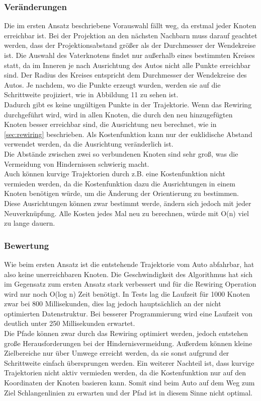\subsubsection{Veränderungen}
Die im ersten Ansatz beschriebene Vorauswahl fällt weg, da erstmal jeder Knoten erreichbar ist. Bei der Projektion an den nächsten Nachbarn muss darauf geachtet werden, dass der Projektionsabstand größer als der Durchmesser der Wendekreise ist. Die Auswahl des Vaterknotens findet nur außerhalb eines bestimmten Kreises statt, da im Inneren je nach Ausrichtung des Autos nicht alle Punkte erreichbar sind. Der Radius des Kreises entspricht dem Durchmesser der Wendekreise des Autos. Je nachdem, wo die Punkte erzeugt wurden, werden sie auf die Schrittweite projiziert, wie in Abbildung 11 zu sehen ist.\\
Dadurch gibt es keine ungültigen Punkte in der Trajektorie. Wenn das Rewiring durchgeführt wird, wird in allen Knoten, die durch den neu hinzugefügten Knoten besser erreichbar sind, die Ausrichtung neu berechnet, wie in \ref{sec:rewiring} beschrieben. Als Kostenfunktion kann nur der euklidische Abstand verwendet werden, da die Ausrichtung veränderlich ist. \\
Die Abstände zwischen zwei so verbundenen Knoten sind sehr groß, was die Vermeidung von Hindernissen schwierig macht.\\
Auch können kurvige Trajektorien durch z.B. eine Kostenfunktion nicht vermieden werden, da die Kostenfunktion dazu die Ausrichtungen in einem Knoten benötigen würde, um die Änderung der Orientierung zu bestimmen. Diese Ausrichtungen können zwar bestimmt werde, ändern sich jedoch mit jeder Neuverknüpfung. Alle Kosten jedes Mal neu zu berechnen, würde mit O(n) viel zu lange dauern.\\
\subsubsection{Bewertung}
Wie beim ersten Ansatz ist die entstehende Trajektorie vom Auto abfahrbar, hat also keine unerreichbaren Knoten. Die Geschwindigkeit des Algorithmus hat sich im Gegensatz zum ersten Ansatz stark verbessert und für die Rewiring Operation wird nur noch O(log n) Zeit benötigt. In Tests lag die Laufzeit für 1000 Knoten zwar bei 800 Millisekunden, dies lag jedoch hauptsächlich an der nicht optimierten Datenstruktur. Bei besserer Programmierung wird eine Laufzeit von deutlich unter 250 Millisekunden erwartet. \\
Die Pfade können zwar durch das Rewiring optimiert werden, jedoch entstehen große Herausforderungen bei der Hindernisvermeidung. Außerdem können kleine Zielbereiche nur über Umwege erreicht werden, da sie sonst aufgrund der Schrittweite einfach übersprungen werden. Ein weiterer Nachteil ist, dass kurvige Trajektorien nicht aktiv vermieden werden, da die Kostenfunktion nur auf den Koordinaten der Knoten basieren kann. Somit sind beim Auto auf dem Weg zum Ziel Schlangenlinien zu erwarten und der Pfad ist in diesem Sinne nicht optimal.


